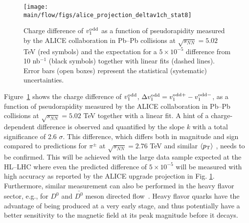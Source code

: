 \begin{figure}[!htb]
\begin{center}
\texttt{[image: \\main/flow/figs/alice\_projection\_deltav1ch\_stat8]}
\caption{Charge difference of $v_1^{\rm odd}$ as a function of pseudorapidity measured by the ALICE collaboration in Pb--Pb collisions at $\sqrt{s_{NN}}=5.02$ TeV  \cite{Margutti:2017lup} (red symbols) and the expectation for a $5 \times 10^{-5}$ difference \cite{Gursoy:2014aka} from 10 nb$^{-1}$ (black symbols) together with linear fits (dashed lines). Error bars (open boxes) represent the statistical (systematic) uncertainties.}
\label{fig:alice_delta_v1}
\end{center}
\end{figure}


Figure~\ref{fig:alice_delta_v1} shows the charge difference of $v_1^{\rm odd}$, 
$\Delta v_1^{\rm odd}=v_1^{\rm odd +} - v_1^{\rm odd -}$, as a function of pseudorapidity measured by the ALICE collaboration in Pb--Pb collisions 
at $\sqrt{s_{NN}}=5.02$ TeV \cite{Margutti:2017lup} together with a linear fit. A hint of a charge-dependent difference is observed and quantified 
by the slope $k$ with a total significance of 2.6 $\sigma$. This difference, which differs both in magnitude and sign compared to predictions for 
$\pi^{\pm}$ at $\sqrt{s_{NN}}=2.76$ TeV and similar $\langle p_{\rm T} \rangle$ \cite{Gursoy:2014aka}, needs to be confirmed. 
This will be achieved 
with the large data sample expected at the HL--LHC where even the predicted difference of $5 \times 10^{-5}$ will be measured with high accuracy 
as reported by the ALICE upgrade projection in Fig. \ref{fig:alice_delta_v1}. Furthermore, similar measurement can also be performed
in the heavy flavor sector, e.g., for $D^{0}$ and $\bar{D^{0}}$ meson directed flow~\cite{Das:2016cwd}. Heavy flavor quarks have the advantage of
being produced at a very early stage, and thus potentially have a better sensitivity to the magnetic field at its peak magnitude before it decays.




